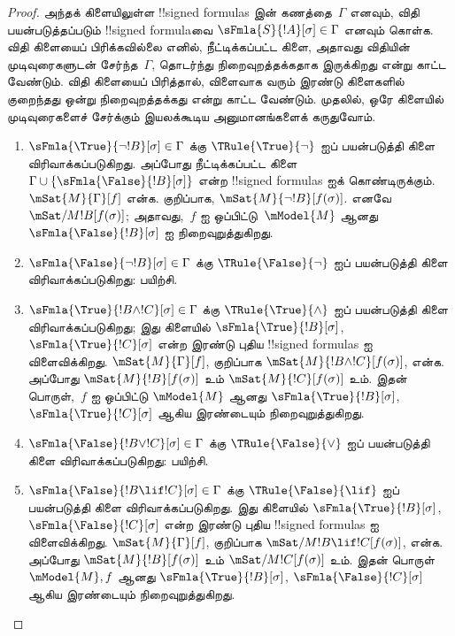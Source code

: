 \documentclass[../../../include/open-logic-section]{subfiles}
\begin{document}
\begin{proof}
அந்தக் கிளையிலுள்ள !!{signed formula}s இன் கணத்தை~$\Gamma$ எனவும், விதி
பயன்படுத்தப்படும் !!{signed formula}வை $\sFmla{S}{!A}[\sigma] \in
\Gamma$ எனவும் கொள்க. விதி கிளையைப் பிரிக்கவில்லை எனில், நீட்டிக்கப்பட்ட
கிளை, அதாவது விதியின் முடிவுரைகளுடன் சேர்ந்த~$\Gamma$, தொடர்ந்து
நிறைவுறத்தக்கதாக இருக்கிறது என்று காட்ட வேண்டும். விதி கிளையைப் பிரித்தால்,
விளைவாக வரும் இரண்டு கிளைகளில் குறைந்தது ஒன்று நிறைவுறத்தக்கது என்று காட்ட
வேண்டும்.
முதலில், ஒரே கிளையில் முடிவுரைகளைச் சேர்க்கும் இயலக்கூடிய அனுமானங்களைக்
கருதுவோம்.
\begin{enumerate}
\item $\sFmla{\True}{\lnot !B}[\sigma] \in \Gamma$ க்கு
  $\TRule{\True}{\lnot}$ ஐப் பயன்படுத்தி கிளை விரிவாக்கப்படுகிறது. அப்போது
  நீட்டிக்கப்பட்ட கிளை $\Gamma \cup
  \{\sFmla{\False}{!B}[\sigma]\}$ என்ற !!{signed formula}s ஐக்
  கொண்டிருக்கும். $\mSat{M}{\Gamma}[f]$ என்க. குறிப்பாக,
  $\mSat{M}{\lnot !B}[f(\sigma)]$. எனவே
  $\mSat/{M}{!B}[f(\sigma)]$; அதாவது,~$f$ ஐ ஒப்பிட்டு~$\mModel{M}$ ஆனது
  $\sFmla{\False}{!B}[\sigma]$ ஐ நிறைவுறுத்துகிறது.
\item $\sFmla{\False}{\lnot !B}[\sigma] \in \Gamma$ க்கு
  $\TRule{\False}{\lnot}$ ஐப் பயன்படுத்தி கிளை விரிவாக்கப்படுகிறது:
  பயிற்சி.
\item $\sFmla{\True}{!B \land !C}[\sigma] \in \Gamma$ க்கு
  $\TRule{\True}{\land}$ ஐப் பயன்படுத்தி கிளை விரிவாக்கப்படுகிறது; இது
  கிளையில் $\sFmla{\True}{!B}[\sigma]$, $\sFmla{\True}{!C}[\sigma]$
  என்ற இரண்டு புதிய !!{signed formula}s ஐ விளைவிக்கிறது.
  $\mSat{M}{\Gamma}[f]$, குறிப்பாக $\mSat{M}{!B \land
    !C}[f(\sigma)]$, என்க. அப்போது $\mSat{M}{!B}[f(\sigma)]$ உம்
  $\mSat{M}{!C}[f(\sigma)]$ உம். இதன் பொருள்,~$f$ ஐ ஒப்பிட்டு
  $\mModel{M}$ ஆனது $\sFmla{\True}{!B}[\sigma]$,
  $\sFmla{\True}{!C}[\sigma]$ ஆகிய இரண்டையும் நிறைவுறுத்துகிறது.
\item $\sFmla{\False}{!B \lor !C}[\sigma] \in \Gamma$ க்கு
  $\TRule{\False}{\lor}$ ஐப் பயன்படுத்தி கிளை விரிவாக்கப்படுகிறது: பயிற்சி.
\item $\sFmla{\False}{!B \lif !C}[\sigma] \in \Gamma$ க்கு
  $\TRule{\False}{\lif}$ ஐப் பயன்படுத்தி கிளை விரிவாக்கப்படுகிறது. இது
  கிளையில் $\sFmla{\True}{!B}[\sigma]$,
  $\sFmla{\False}{!C}[\sigma]$ என்ற இரண்டு புதிய !!{signed formula}s ஐ
  விளைவிக்கிறது. $\mSat{M}{\Gamma}[f]$, குறிப்பாக
  $\mSat/{M}{!B \lif !C}[f(\sigma)]$, என்க. அப்போது
  $\mSat{M}{!B}[f(\sigma)]$ உம் $\mSat/{M}{!C}[f(\sigma)]$ உம்.
  இதன் பொருள் $\mModel{M}, f$ ஆனது $\sFmla{\True}{!B}[\sigma]$,
  $\sFmla{\False}{!C}[\sigma]$ ஆகிய இரண்டையும் நிறைவுறுத்துகிறது.


\end{enumerate}
\end{proof}
\end{document}
